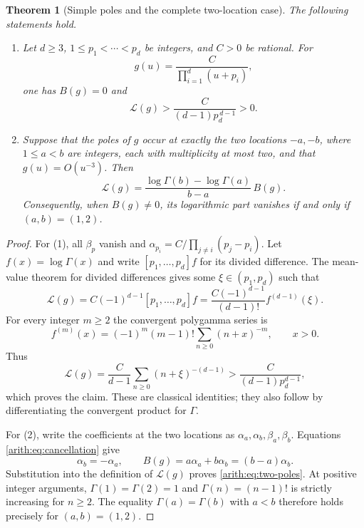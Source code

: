 \documentclass[11pt,a4paper]{article}
\newtheorem{theorem}{Theorem}[section]
\theoremstyle{definition}\newtheorem{definition}[theorem]{Definition}
\theoremstyle{remark}\newtheorem{remark}[theorem]{Remark}
\begin{document}
\begin{theorem}[Simple poles and the complete two-location case]
\label{arith:thm:pole-classification}
The following statements hold.
\begin{enumerate}
\item Let $d\ge3$, $1\le p_1<\cdots<p_d$ be integers, and $C>0$ be
rational.  For
\[
 g(u)=\frac{C}{\prod_{i=1}^d(u+p_i)},
\]
one has $B(g)=0$ and
\[
 \mathcal L(g)>\frac{C}{(d-1)p_d^{\,d-1}}>0.
\]
\item Suppose that the poles of $g$ occur at exactly the two locations
$-a,-b$, where $1\le a<b$ are integers, each with multiplicity at most
two, and that $g(u)=O(u^{-3})$.  Then
\begin{equation}\label{arith:eq:two-poles}
 \mathcal L(g)=
    \frac{\log\Gamma(b)-\log\Gamma(a)}{b-a}\,B(g).
\end{equation}
Consequently, when $B(g)\ne0$, its logarithmic part vanishes if and only
if $(a,b)=(1,2)$.
\end{enumerate}
\end{theorem}
\begin{proof}
For (1), all $\beta_p$ vanish and
$\alpha_{p_i}=C/\prod_{j\ne i}(p_j-p_i)$.
Let $f(x)=\log\Gamma(x)$ and write $[p_1,\ldots,p_d]f$ for its divided
difference.  The mean-value theorem for divided differences gives
some $\xi\in(p_1,p_d)$ such that
\[
 \mathcal L(g)=C(-1)^{d-1}[p_1,\ldots,p_d]f
       =\frac{C(-1)^{d-1}}{(d-1)!}f^{(d-1)}(\xi).
\]
For every integer $m\ge2$ the convergent polygamma series is
\[
 f^{(m)}(x)=(-1)^m(m-1)!\sum_{n\ge0}(n+x)^{-m},\qquad x>0.
\]
Thus
\[
 \mathcal L(g)=\frac{C}{d-1}\sum_{n\ge0}(n+\xi)^{-(d-1)}
       >\frac{C}{(d-1)p_d^{d-1}},
\]
which proves the claim.  These are classical identities; they also follow
by differentiating the convergent product for $\Gamma$.

For (2), write the coefficients at the two locations as
$\alpha_a,\alpha_b,\beta_a,\beta_b$.  Equations
\eqref{arith:eq:cancellation} give
\[
 \alpha_b=-\alpha_a,\qquad
 B(g)=a\alpha_a+b\alpha_b=(b-a)\alpha_b.
\]
Substitution into the definition of $\mathcal L(g)$ proves
\eqref{arith:eq:two-poles}.  At positive integer arguments,
$\Gamma(1)=\Gamma(2)=1$ and $\Gamma(n)=(n-1)!$ is strictly increasing
for $n\ge2$.  The equality $\Gamma(a)=\Gamma(b)$ with $a<b$
therefore holds precisely for $(a,b)=(1,2)$.
\end{proof}
\end{document}
